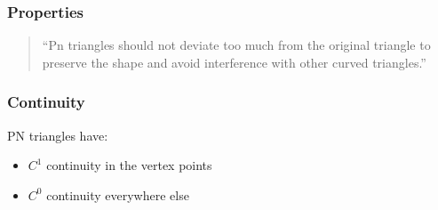 

\begin{frame}\frametitle{Properties}
	\begin{quote}
		``Pn triangles should not deviate too much from the original triangle to preserve the shape and avoid interference with other curved triangles.''
		\citeauthor{vlachos2001curved}
	\end{quote}
\end{frame}

\begin{frame}\frametitle{Continuity}
	PN triangles have:
	\begin{itemize}
		\item $C^1$ continuity in the vertex points
		\item $C^0$ continuity everywhere else
	\end{itemize}
\end{frame}

